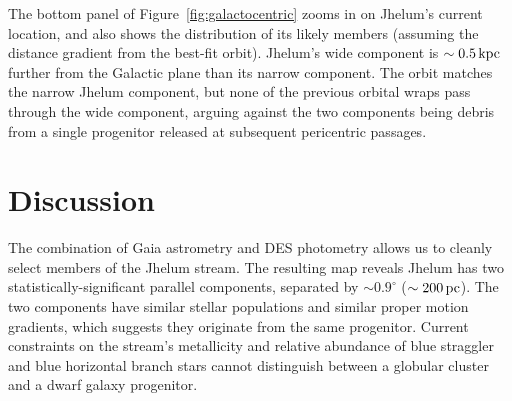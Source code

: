 \documentclass[twocolumn]{aastex62}
\begin{document}
The bottom panel of Figure~\ref{fig:galactocentric} zooms in on Jhelum's current location, and also shows the distribution of its likely members (assuming the distance gradient from the best-fit orbit).
Jhelum's wide component is $\sim0.5\,\rm kpc$ further from the Galactic plane than its narrow component.
The orbit matches the narrow Jhelum component, but none of the previous orbital wraps pass through the wide component, arguing against the two components being debris from a single progenitor released at subsequent pericentric passages.


\section{Discussion}
\label{sec:discussion}
The combination of Gaia astrometry and DES photometry allows us to cleanly select members of the Jhelum stream.
The resulting map reveals Jhelum has two statistically-significant parallel components, separated by $\sim0.9^\circ$ ($\sim200\,\rm pc$).
The two components have similar stellar populations and similar proper motion gradients, which suggests they originate from the same progenitor.
Current constraints on the stream's metallicity and relative abundance of blue straggler and blue horizontal branch stars cannot distinguish between a globular cluster and a dwarf galaxy progenitor.
\end{document}

